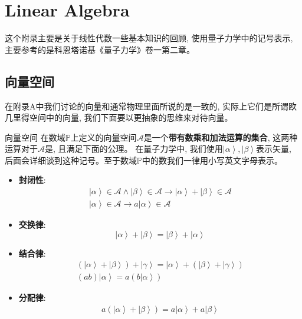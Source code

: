\chapter{Linear Algebra}
\label{Appendix B}
这个附录主要是关于线性代数一些基本知识的回顾, 使用量子力学中的记号表示, 主要参考的是科恩塔诺基《量子力学》卷一第二章。
\section{向量空间}
在附录A中我们讨论的向量和通常物理里面所说的是一致的, 实际上它们是所谓欧几里得空间中的向量, 我们下面要以更抽象的思维来对待向量。
\begin{define}{向量空间}
    在数域$\mathbb{P}$上定义的向量空间$\mathscr{A}$是一个\textbf{带有数乘和加法运算的集合}, 这两种运算对于$\mathscr{A}$是, 且满足下面的公理。
在量子力学中, 我们使用$\left| \alpha  \right\rangle ,\left| \beta  \right\rangle $表示矢量, 后面会详细谈到这种记号。至于数域$\mathbb{P}$中的数我们一律用小写英文字母表示。
\begin{itemize}
    \item \textbf{封闭性}:
        \[\begin{array}{l}
        \left| \alpha  \right\rangle  \in \mathscr{A} \wedge \left| \beta  \right\rangle  \in \mathscr{A} \to \left| \alpha  \right\rangle  + \left| \beta  \right\rangle  \in \mathscr{A}\\
        \left| \alpha  \right\rangle  \in \mathscr{A} \to a\left| \alpha  \right\rangle  \in \mathscr{A}
        \end{array}\]
    \item \textbf{交换律}:\[\left| \alpha  \right\rangle  + \left| \beta  \right\rangle  = \left| \beta  \right\rangle  + \left| \alpha  \right\rangle \]
    \item \textbf{结合律}:\[\begin{array}{l}
        \left( {\left| \alpha  \right\rangle  + \left| \beta  \right\rangle } \right) + \left| \gamma  \right\rangle  = \left| \alpha  \right\rangle  + \left( {\left| \beta  \right\rangle  + \left| \gamma  \right\rangle } \right)\\
        \left( {ab} \right)\left| \alpha  \right\rangle  = a\left( {b\left| \alpha  \right\rangle } \right)
        \end{array}\]
    \item \textbf{分配律}:\[\begin{array}{l}
        a\left( {\left| \alpha  \right\rangle  + \left| \beta  \right\rangle } \right) = a\left| \alpha  \right\rangle  + a\left| \beta  \right\rangle \\

\end{array}\]
\end{itemize}
\end{define}
